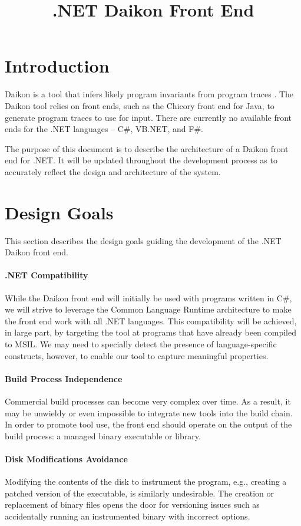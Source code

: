 \documentclass{article}
\title{.NET Daikon Front End}
\begin{document}
\maketitle

\section{Introduction}
Daikon is a tool that infers likely program invariants from program traces \cite{DaikonUserManual:Online}. The Daikon tool relies on front ends, such as the Chicory front end for Java, to generate program traces to use for input. There are currently no available front ends for the .NET languages -- C\#, VB.NET, and F\#.

The purpose of this document is to describe the architecture of a Daikon front end for .NET. It will be updated throughout the development process as to accurately reflect the design and architecture of the system.

\section{Design Goals}
This section describes the design goals guiding the development of the .NET Daikon front end.

\paragraph{.NET Compatibility}
While the Daikon front end will initially be used with programs written in C\#, we will strive to leverage the Common Language Runtime architecture to make the front end work with all .NET languages. This compatibility will be achieved, in large part, by targeting the tool at programs that have already been compiled to MSIL. We may need to specially detect the presence of language-specific constructs, however, to enable our tool to capture meaningful properties.

\paragraph{Build Process Independence}
Commercial build processes can become very complex over time. As a result, it may be unwieldy or even impossible to integrate new tools into the build chain. In order to promote tool use, the front end should operate on the output of the build process: a managed binary executable or library.

\paragraph{Disk Modifications Avoidance}
Modifying the contents of the disk to instrument the program, e.g., creating a patched version of the executable, is similarly undesirable. The creation or replacement of binary files opens the door for versioning issues such as accidentally running an instrumented binary with incorrect options.
\end{document}
